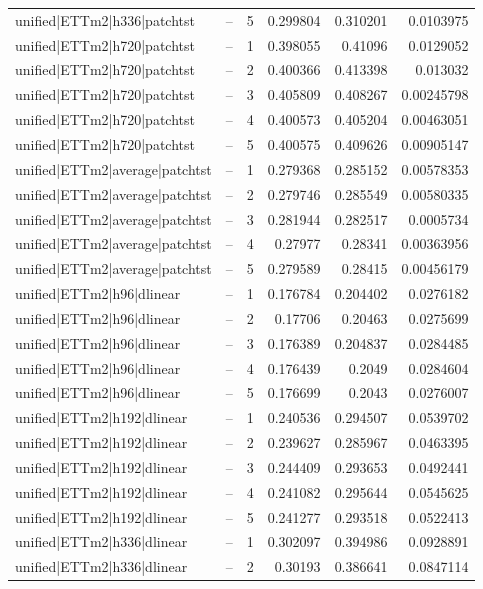 \begin{longtable}{llrrrr}
unified|ETTm2|h336|patchtst & -- & 5 & 0.299804 & 0.310201 & 0.0103975 \\
unified|ETTm2|h720|patchtst & -- & 1 & 0.398055 & 0.41096 & 0.0129052 \\
unified|ETTm2|h720|patchtst & -- & 2 & 0.400366 & 0.413398 & 0.013032 \\
unified|ETTm2|h720|patchtst & -- & 3 & 0.405809 & 0.408267 & 0.00245798 \\
unified|ETTm2|h720|patchtst & -- & 4 & 0.400573 & 0.405204 & 0.00463051 \\
unified|ETTm2|h720|patchtst & -- & 5 & 0.400575 & 0.409626 & 0.00905147 \\
unified|ETTm2|average|patchtst & -- & 1 & 0.279368 & 0.285152 & 0.00578353 \\
unified|ETTm2|average|patchtst & -- & 2 & 0.279746 & 0.285549 & 0.00580335 \\
unified|ETTm2|average|patchtst & -- & 3 & 0.281944 & 0.282517 & 0.0005734 \\
unified|ETTm2|average|patchtst & -- & 4 & 0.27977 & 0.28341 & 0.00363956 \\
unified|ETTm2|average|patchtst & -- & 5 & 0.279589 & 0.28415 & 0.00456179 \\
unified|ETTm2|h96|dlinear & -- & 1 & 0.176784 & 0.204402 & 0.0276182 \\
unified|ETTm2|h96|dlinear & -- & 2 & 0.17706 & 0.20463 & 0.0275699 \\
unified|ETTm2|h96|dlinear & -- & 3 & 0.176389 & 0.204837 & 0.0284485 \\
unified|ETTm2|h96|dlinear & -- & 4 & 0.176439 & 0.2049 & 0.0284604 \\
unified|ETTm2|h96|dlinear & -- & 5 & 0.176699 & 0.2043 & 0.0276007 \\
unified|ETTm2|h192|dlinear & -- & 1 & 0.240536 & 0.294507 & 0.0539702 \\
unified|ETTm2|h192|dlinear & -- & 2 & 0.239627 & 0.285967 & 0.0463395 \\
unified|ETTm2|h192|dlinear & -- & 3 & 0.244409 & 0.293653 & 0.0492441 \\
unified|ETTm2|h192|dlinear & -- & 4 & 0.241082 & 0.295644 & 0.0545625 \\
unified|ETTm2|h192|dlinear & -- & 5 & 0.241277 & 0.293518 & 0.0522413 \\
unified|ETTm2|h336|dlinear & -- & 1 & 0.302097 & 0.394986 & 0.0928891 \\
unified|ETTm2|h336|dlinear & -- & 2 & 0.30193 & 0.386641 & 0.0847114 \\

\end{longtable}
